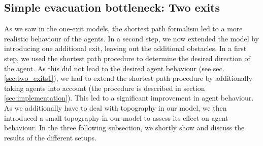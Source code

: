 \documentclass[11pt]{article}
\begin{document}
\subsection{Simple evacuation bottleneck: Two exits}
As we saw in the one-exit models, the shortest path formalism led to a more realistic behaviour of the agents. In a second step, we now extended the model by introducing one additional exit, leaving out the additional obstacles. In a first step, we used the shortest path procedure to determine the desired direction of the agent. As this did not lead to the desired agent behaviour (see sec. \ref{sec:two_exits1}), we had to extend the shortest path procedure by additionally taking agents into account (the procedure is described in section \ref{sec:implementation}). This led to a significant improvement in agent behaviour. As we additionally have to deal with topography in our model, we then introduced a small topography in our model to assess its effect on agent behaviour. In the three following subsection, we shortly show and discuss the results of the different setups.
\end{document}
